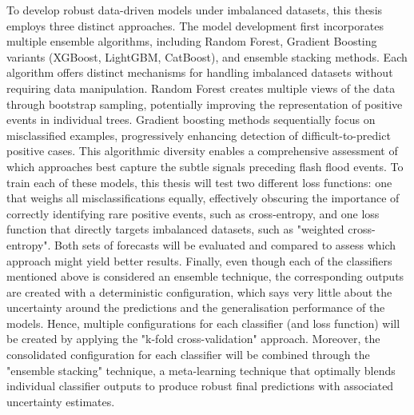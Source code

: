 To  develop robust data-driven models under imbalanced datasets, this thesis employs three distinct approaches. The model development first incorporates multiple ensemble algorithms, including Random Forest, Gradient Boosting variants (XGBoost, LightGBM, CatBoost), and ensemble stacking methods. Each algorithm offers distinct mechanisms for handling imbalanced datasets without requiring data manipulation. Random Forest creates multiple views of the data through bootstrap sampling, potentially improving the representation of positive events in individual trees. Gradient boosting methods sequentially focus on misclassified examples, progressively enhancing detection of difficult-to-predict positive cases. This algorithmic diversity enables a comprehensive assessment of which approaches best capture the subtle signals preceding flash flood events. To train each of these models, this thesis will test two different loss functions: one that weighs all misclassifications equally, effectively obscuring the importance of correctly identifying rare positive events, such as cross-entropy, and one loss function that directly targets imbalanced datasets, such as "weighted cross-entropy". Both sets of forecasts will be evaluated and compared to assess which approach might yield better results. Finally, even though each of the classifiers mentioned above is considered an ensemble technique, the corresponding outputs are created with a deterministic configuration, which says very little about the uncertainty around the predictions and the generalisation performance of the models. Hence, multiple configurations for each classifier (and loss function) will be created by applying the "k-fold cross-validation" approach. Moreover, the consolidated configuration for each classifier will be combined through the "ensemble stacking" technique, a meta-learning technique that optimally blends individual classifier outputs to produce robust final predictions with associated uncertainty estimates.

